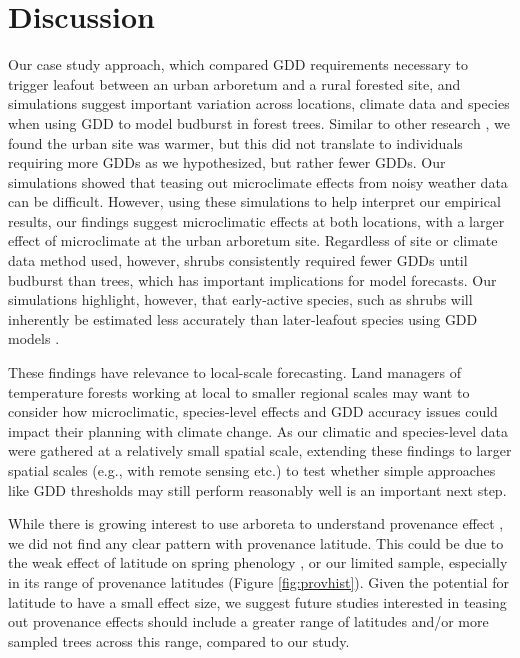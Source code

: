 \documentclass{article}\usepackage[]{graphicx}\usepackage[]{color}
\newcommand{\R}[1]{\label{#1}\linelabel{#1}}
\begin{document}
\section{Discussion} 
Our case study approach, which compared GDD requirements necessary to trigger leafout between an urban arboretum and a rural forested site, and simulations suggest important variation across locations, climate data and species when using GDD to model budburst in forest trees. Similar to other research \citep{Meng2020}, we found the urban site was warmer, but this did not translate to individuals requiring more GDDs as we hypothesized, but rather fewer GDDs. Our simulations showed that teasing out microclimate effects from noisy weather data can be difficult. However, using these simulations to help interpret our empirical results, our findings suggest microclimatic effects at both locations, with a larger effect of microclimate at the urban arboretum site. Regardless of site or climate data method used, however, shrubs consistently required fewer GDDs until budburst than trees, which has important implications for model forecasts. Our simulations highlight, however, that early-active species, such as shrubs will inherently be estimated less accurately than later-leafout species using GDD models \citep{Basler2016}. 

\R{Z1largespatialscale}These findings have relevance to local-scale forecasting. Land managers of temperature forests working at local to smaller regional scales may want to consider how microclimatic, species-level effects and GDD accuracy issues could impact their planning with climate change. As our climatic and species-level data were gathered at a relatively small spatial scale, extending these findings to larger spatial scales (e.g., with remote sensing etc.) to test whether simple approaches like GDD thresholds may still perform reasonably well is an important next step.\R{Z1scaleend}

While there is growing interest to use arboreta to understand provenance effect \citep{Primack2009}, we did not find any clear pattern with provenance latitude. This could be due to the weak effect of latitude on spring phenology \citep{Gauzere2017}, or our limited sample, especially in its range of provenance latitudes (Figure \ref{fig:provhist}). Given the potential for latitude to have a small effect size, we suggest future studies interested in teasing out provenance effects should include a greater range of latitudes and/or more sampled trees across this range, compared to our study. 
\end{document}
